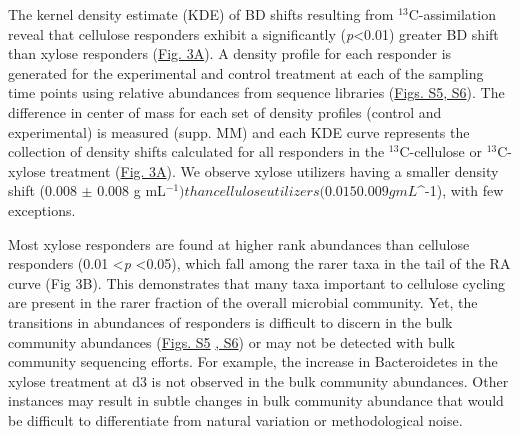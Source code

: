 The kernel density estimate (KDE) of BD shifts resulting from
$^{13}$C-assimilation reveal that cellulose responders exhibit a
significantly (\textit{p}\textless 0.01) greater BD shift than xylose
responders
(\href{https://authorea.com/users/3537/articles/3612/master/file/figures/shift_and_rabund2/shift_and_rabund2.png}{Fig.
3A}). A density profile for each responder is generated for the experimental
and control treatment at each of the sampling time points using relative
abundances from sequence libraries
(\href{https://authorea.com/users/3537/articles/8459/master/file/figures/xylose_resp_profiles/xylose_resp_profiles.png}{Figs.
S5}\href{https://authorea.com/users/3537/articles/8459/master/file/figures/cellulose_resp_profiles/cellulose_resp_profiles.png}{,
S6}). The difference in center of mass for each set of density profiles
(control and experimental) is measured (supp. MM) and each KDE curve represents
the collection of density shifts calculated for all responders in the
$^{13}$C-cellulose or $^{13}$C-xylose treatment
(\href{https://authorea.com/users/3537/articles/3612/master/file/figures/shift_and_rabund2/shift_and_rabund2.png}{Fig.
3A}). We observe xylose utilizers having a smaller density shift (0.008 $\pm$
0.008 g mL$^{-1}) than cellulose utilizers (0.015 $\pm$ 0.009 g
mL$^{-1}), with few exceptions. 

Most xylose responders are found at higher rank abundances than cellulose
responders (0.01 \textless \textit{p} \textless 0.05), which fall among the
rarer taxa in the tail of the RA curve (Fig 3B). This demonstrates that many
taxa important to cellulose cycling are present in the rarer fraction of the
overall microbial community. Yet, the transitions in abundances of responders
is difficult to discern in the bulk community abundances
(\href{https://authorea.com/users/3537/articles/8459/master/file/figures/xylose_resp_profiles/xylose_resp_profiles.png}{Figs.
S5}
\href{https://authorea.com/users/3537/articles/8459/master/file/figures/cellulose_resp_profiles/cellulose_resp_profiles.png}{,
S6}) or may not be detected with bulk community sequencing efforts. For
example, the increase in Bacteroidetes in the xylose treatment at d3 is not
observed in the bulk community abundances. Other instances may result in subtle
changes in bulk community abundance that would be difficult to differentiate
from natural variation or methodological noise.


